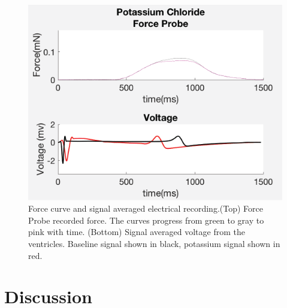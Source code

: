 \documentclass[12pt]{article}
\begin{document}
\begin{figure}[H]
	\label{fig:KCL}
	\centering
	\includegraphics[width = .95\textwidth]{Figures/KCl.png}
	\caption{Force curve and signal averaged electrical recording.(Top) Force Probe recorded force. The curves progress from green to gray to pink with time. (Bottom) Signal averaged voltage from the ventricles. Baseline signal shown in black, potassium signal shown in red. }
\end{figure}
\section{Discussion}





%
%
\end{document}
